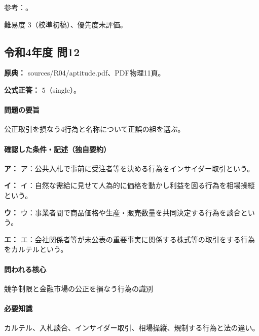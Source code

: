 \par 参考：\cite{mof_procurement2006,jftc_rules,jftc_kansei,jftc_private2018}。

\par 難易度 3（校準初稿）、優先度未評価。

\subsection{令和4年度 問12}
\label{q:r04-reg-apt-12}

\noindent\textbf{原典：} sources/R04/aptitude.pdf、PDF物理11頁。

\textbf{公式正答：} 5（single）。

\paragraph{問題の要旨} 公正取引を損なう4行為と名称について正誤の組を選ぶ。

\paragraph{確認した条件・記述（独自要約）}\mbox{}\par

\noindent\textbf{ア：} ア：公共入札で事前に受注者等を決める行為をインサイダー取引という。\par

\noindent\textbf{イ：} イ：自然な需給に見せて人為的に価格を動かし利益を図る行為を相場操縦という。\par

\noindent\textbf{ウ：} ウ：事業者間で商品価格や生産・販売数量を共同決定する行為を談合という。\par

\noindent\textbf{エ：} エ：会社関係者等が未公表の重要事実に関係する株式等の取引をする行為をカルテルという。\par

\paragraph{問われる核心} 競争制限と金融市場の公正を損なう行為の識別

\paragraph{必要知識} カルテル、入札談合、インサイダー取引、相場操縦、規制する行為と法の違い。

